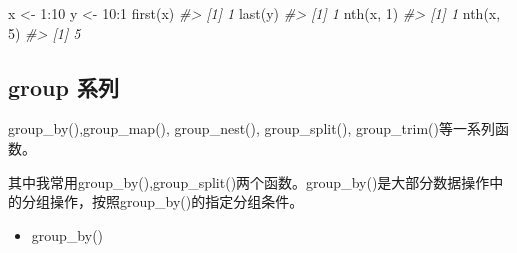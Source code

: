 \documentclass[
]{book}
\newenvironment{Shaded}{\begin{snugshade}}{\end{snugshade}}
\newcommand{\CommentTok}[1]{\textcolor[rgb]{0.56,0.35,0.01}{\textit{#1}}}
\newcommand{\DecValTok}[1]{\textcolor[rgb]{0.00,0.00,0.81}{#1}}
\newcommand{\FunctionTok}[1]{\textcolor[rgb]{0.00,0.00,0.00}{#1}}
\newcommand{\NormalTok}[1]{#1}
\newcommand{\OtherTok}[1]{\textcolor[rgb]{0.56,0.35,0.01}{#1}}
\newcommand{\SpecialCharTok}[1]{\textcolor[rgb]{0.00,0.00,0.00}{#1}}
\providecommand{\tightlist}{%
  \setlength{\itemsep}{0pt}\setlength{\parskip}{0pt}}
\begin{document}
\begin{Shaded}
\begin{Highlighting}[]
\NormalTok{x }\OtherTok{\textless{}{-}} \DecValTok{1}\SpecialCharTok{:}\DecValTok{10}
\NormalTok{y }\OtherTok{\textless{}{-}} \DecValTok{10}\SpecialCharTok{:}\DecValTok{1}
\FunctionTok{first}\NormalTok{(x)}
\CommentTok{\#\textgreater{} [1] 1}
\FunctionTok{last}\NormalTok{(y)}
\CommentTok{\#\textgreater{} [1] 1}
\FunctionTok{nth}\NormalTok{(x, }\DecValTok{1}\NormalTok{)}
\CommentTok{\#\textgreater{} [1] 1}
\FunctionTok{nth}\NormalTok{(x, }\DecValTok{5}\NormalTok{)}
\CommentTok{\#\textgreater{} [1] 5}
\end{Highlighting}
\end{Shaded}

\hypertarget{group-ux7cfbux5217}{%
\subsection{group 系列}\label{group-ux7cfbux5217}}

group\_by(),group\_map(), group\_nest(), group\_split(), group\_trim()等一系列函数。

其中我常用group\_by(),group\_split()两个函数。group\_by()是大部分数据操作中的分组操作，按照group\_by()的指定分组条件。

\begin{itemize}
\tightlist
\item
  group\_by()
\end{itemize}
\end{document}
